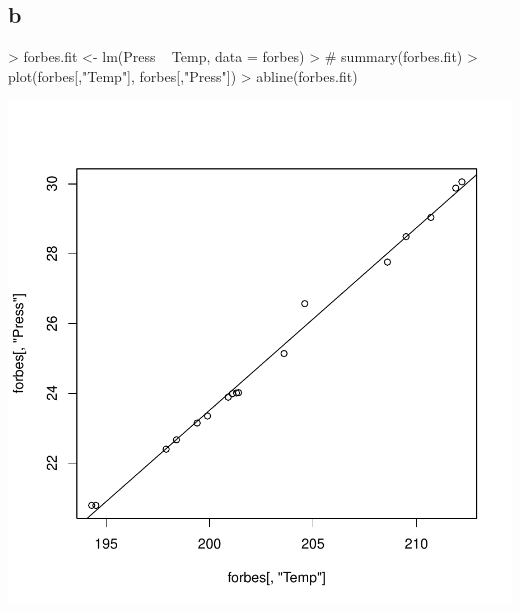 \subsection{b}
\begin{Schunk}
\begin{Sinput}
> forbes.fit <- lm(Press ~ Temp, data = forbes)
> # summary(forbes.fit)
> plot(forbes[,"Temp"], forbes[,"Press"])
> abline(forbes.fit)
\end{Sinput}
\end{Schunk}
\includegraphics{sw12_1-002}

